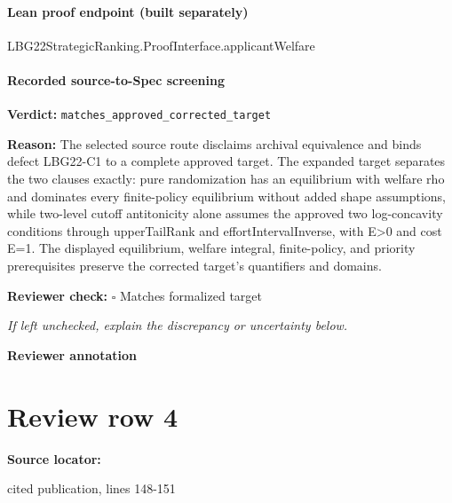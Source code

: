 \documentclass[10pt]{article}
\newcommand{\reviewerbox}{%
  \par\noindent\fbox{\parbox{0.96\linewidth}{\rule{0pt}{0.38in}}}\par
}
\newcommand{\reviewmatch}[1]{%
  \par\noindent\textbf{Reviewer check:} $\square$\; #1\par
  \noindent\emph{If left unchecked, explain the discrepancy or uncertainty below.}\par
}
\begin{document}
\paragraph{Lean proof endpoint (built separately)}\begin{ReviewVerbatim}
LBG22StrategicRanking.ProofInterface.applicantWelfare
\end{ReviewVerbatim}

\paragraph{Recorded source-to-Spec screening}
\textbf{Verdict:} \texttt{matches\_approved\_corrected\_target}
\\
{\raggedright
\textbf{Reason:} The selected source route disclaims archival equivalence and binds defect LBG22-\allowbreak{}C1 to a complete approved target.\allowbreak{} The expanded target separates the two clauses exactly:\allowbreak{} pure randomization has an equilibrium with welfare rho and dominates every finite-\allowbreak{}policy equilibrium without added shape assumptions, while two-\allowbreak{}level cutoff antitonicity alone assumes the approved two log-\allowbreak{}concavity conditions through upperTailRank and effortIntervalInverse, with E>0 and cost E=1.\allowbreak{} The displayed equilibrium, welfare integral, finite-\allowbreak{}policy, and priority prerequisites preserve the corrected target's quantifiers and domains.\allowbreak{}
\par}
\reviewmatch{Matches formalized target}
\noindent\textbf{Reviewer annotation}\par
\reviewerbox
\clearpage
\hypertarget{source-claim-1ba4d8c13750bf79}{}
\section*{Review row 4}
\textbf{Source locator:} {\footnotesize\raggedright cited publication, lines 148-\allowbreak{}151\par}
\end{document}
